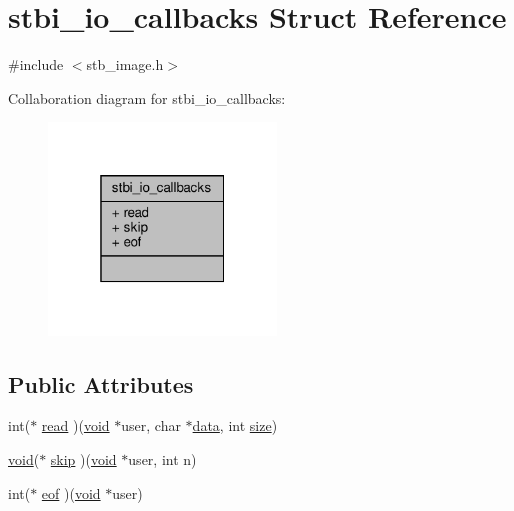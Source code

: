 \hypertarget{structstbi__io__callbacks}{}\section{stbi\+\_\+io\+\_\+callbacks Struct Reference}
\label{structstbi__io__callbacks}


{\ttfamily \#include $<$stb\+\_\+image.\+h$>$}



Collaboration diagram for stbi\+\_\+io\+\_\+callbacks\+:
\nopagebreak
\begin{figure}[H]
\begin{center}
\leavevmode
\includegraphics[width=172pt]{structstbi__io__callbacks__coll__graph}
\end{center}
\end{figure}
\subsection*{Public Attributes}
\begin{DoxyCompactItemize}
\item 
int($\ast$ \hyperlink{structstbi__io__callbacks_a623e46b3a2a019611601409926283a88}{read} )(\hyperlink{imgui__impl__opengl3__loader_8h_ac668e7cffd9e2e9cfee428b9b2f34fa7}{void} $\ast$user, char $\ast$\hyperlink{imgui__impl__opengl3__loader_8h_abd87654504355b4c1bb002dcb1d4d16a}{data}, int \hyperlink{imgui__impl__opengl3__loader_8h_a3d1e3edfcf61ca2d831883e1afbad89e}{size})
\item 
\hyperlink{imgui__impl__opengl3__loader_8h_ac668e7cffd9e2e9cfee428b9b2f34fa7}{void}($\ast$ \hyperlink{structstbi__io__callbacks_a257aac5480a90a6c4b8fbe86c1b01068}{skip} )(\hyperlink{imgui__impl__opengl3__loader_8h_ac668e7cffd9e2e9cfee428b9b2f34fa7}{void} $\ast$user, int n)
\item 
int($\ast$ \hyperlink{structstbi__io__callbacks_a319639db2f76e715eed7a7a974136832}{eof} )(\hyperlink{imgui__impl__opengl3__loader_8h_ac668e7cffd9e2e9cfee428b9b2f34fa7}{void} $\ast$user)
\end{DoxyCompactItemize}


